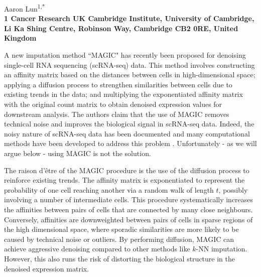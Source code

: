 \documentclass[10pt,letterpaper]{article}
\begin{document}
\vspace*{0.35in}

\begin{flushleft}
{\Large
    \textbf{}
}
\newline

Aaron Lun\textsuperscript{1,*}
\\
\bigskip
\bf{1} Cancer Research UK Cambridge Institute, University of Cambridge, Li Ka Shing Centre, Robinson Way, Cambridge CB2 0RE, United Kingdom \\
\bigskip

\end{flushleft}

\noindent
A new imputation method ``MAGIC" \cite{vandijk2018recovering} has recently been proposed for denoising single-cell RNA sequencing (scRNA-seq) data.
This method involves constructing an affinity matrix based on the distances between cells in high-dimensional space;
applying a diffusion process to strengthen similarities between cells due to existing trends in the data;
and multiplying the exponentiated affinity matrix with the original count matrix to obtain denoised expression values for downstream analysis.
The authors claim that the use of MAGIC removes technical noise and improves the biological signal in scRNA-seq data.
Indeed, the noisy nature of scRNA-seq data has been documented \cite{grun2015design} and many computational methods have been developed to address this problem \cite{bacher2016design}.
Unfortunately - as we will argue below - using MAGIC is not the solution.

The raison d'\^etre of the MAGIC procedure is the use of the diffusion process to reinforce existing trends.
The affinity matrix is exponentiated to represent the probability of one cell reaching another via a random walk of length $t$, possibly involving a number of intermediate cells.
This procedure systematically increases the affinities between pairs of cells that are connected by many close neighbours.
Conversely, affinities are downweighted between pairs of cells in sparse regions of the high dimensional space, 
where sporadic similarities are more likely to be caused by technical noise or outliers.
By performing diffusion, MAGIC can achieve aggressive denoising compared to other methods like $k$-NN imputation.
However, this also runs the risk of distorting the biological structure in the denoised expression matrix.
\end{document}
